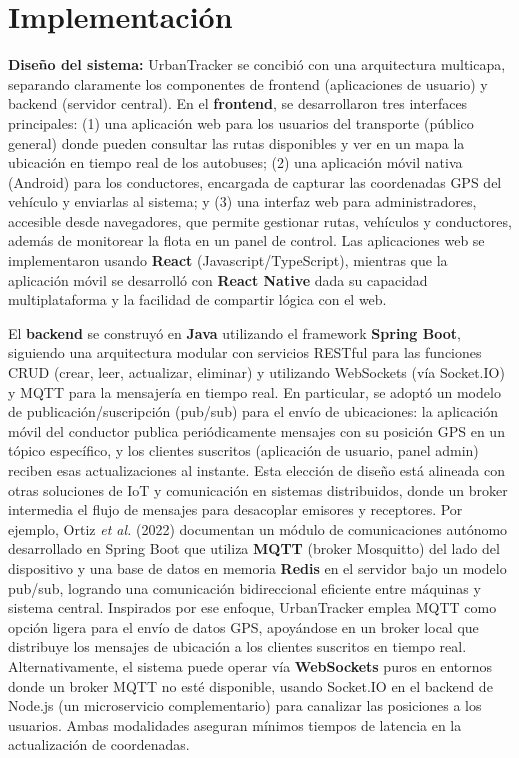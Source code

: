 \section{Implementación}
\textbf{Diseño del sistema:} UrbanTracker se concibió con una arquitectura multicapa, separando claramente los componentes de frontend (aplicaciones de usuario) y backend (servidor central). En el \textbf{frontend}, se desarrollaron tres interfaces principales: (1) una aplicación web para los usuarios del transporte (público general) donde pueden consultar las rutas disponibles y ver en un mapa la ubicación en tiempo real de los autobuses; (2) una aplicación móvil nativa (Android) para los conductores, encargada de capturar las coordenadas GPS del vehículo y enviarlas al sistema; y (3) una interfaz web para administradores, accesible desde navegadores, que permite gestionar rutas, vehículos y conductores, además de monitorear la flota en un panel de control. Las aplicaciones web se implementaron usando \textbf{React} (Javascript/TypeScript), mientras que la aplicación móvil se desarrolló con \textbf{React Native} dada su capacidad multiplataforma y la facilidad de compartir lógica con el web.

El \textbf{backend} se construyó en \textbf{Java} utilizando el framework \textbf{Spring Boot}, siguiendo una arquitectura modular con servicios RESTful para las funciones CRUD (crear, leer, actualizar, eliminar) y utilizando WebSockets (vía Socket.IO) y MQTT para la mensajería en tiempo real. En particular, se adoptó un modelo de publicación/suscripción (pub/sub) para el envío de ubicaciones: la aplicación móvil del conductor publica periódicamente mensajes con su posición GPS en un tópico específico, y los clientes suscritos (aplicación de usuario, panel admin) reciben esas actualizaciones al instante. Esta elección de diseño está alineada con otras soluciones de IoT y comunicación en sistemas distribuidos, donde un broker intermedia el flujo de mensajes para desacoplar emisores y receptores. Por ejemplo, Ortiz \emph{et al.} (2022) documentan un módulo de comunicaciones autónomo desarrollado en Spring Boot que utiliza \textbf{MQTT} (broker Mosquitto) del lado del dispositivo y una base de datos en memoria \textbf{Redis} en el servidor bajo un modelo pub/sub, logrando una comunicación bidireccional eficiente entre máquinas y sistema central\cite{ortiz2022smolcomm}. Inspirados por ese enfoque, UrbanTracker emplea MQTT como opción ligera para el envío de datos GPS, apoyándose en un broker local que distribuye los mensajes de ubicación a los clientes suscritos en tiempo real. Alternativamente, el sistema puede operar vía \textbf{WebSockets} puros en entornos donde un broker MQTT no esté disponible, usando Socket.IO en el backend de Node.js (un microservicio complementario) para canalizar las posiciones a los usuarios. Ambas modalidades aseguran mínimos tiempos de latencia en la actualización de coordenadas.

